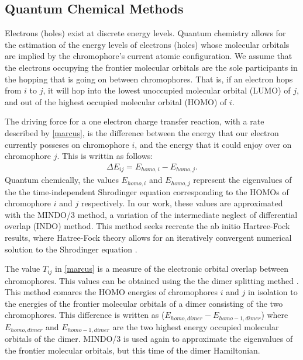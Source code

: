 \subsection{Quantum Chemical Methods}
Electrons (holes) exist at discrete energy levels.
Quantum chemistry allows for the estimation of the energy levels of electrons (holes) whose
molecular orbitals are implied by the chromophore's current atomic configuration.
We assume that the electrons occupying the frontier molecular orbitals are the sole participants in the
hopping that is going on between chromophores. That is, if an electron hops from $i$ to $j$, it will hop
into the lowest unoccupied molecular orbital (LUMO) of $j$, and out of the
highest occupied molecular orbital (HOMO) of $i$.  

The driving force for a one electron charge transfer reaction, 
with a rate described by \autoref{marcus}, is the difference between the energy that our electron 
currently posseses 
on chromophore $i$, and the energy that it could enjoy over on chromophore $j$. 
This is writtin as follows:
\begin{align}
    \Delta E_{ij} = E_{homo, i} - E_{homo, j}.
    \label{gibbs}
\end{align}
Quantum chemically, the values $E_{homo, i}$ and $E_{homo, j}$ represent the eigenvalues of the the
time-independent Shrodinger equation corresponding to the HOMOs of chromophore $i$ and $j$ respectively. 
In our work, these values are approximated with the MINDO/3 method, a variation of the intermediate neglect of 
differential overlap (INDO) method. This method seeks recreate the ab initio Hartree-Fock
results, where Hatree-Fock theory allows for an iteratively convergent numerical solution to the
Shrodinger equation \cite{Thiel2014}. 

The value $T_{ij}$ in \autoref{marcus} is a measure of the electronic orbital overlap between chromophores.
This values can be obtained using the
the dimer splitting methed \cite{Huang2005b}. This method comares the HOMO energies of chromophores $i$ and
$j$ in isolation to the energies of the frontier molecular orbitals of a dimer
consisting of the two chromophores. 
This difference is written as ($E_{homo,dimer} - E_{homo-1,dimer}$) where $E_{homo,dimer}$ 
and $E_{homo-1,dimer}$ are the two highest energy occupied molecular orbitals of the dimer. MINDO/3 is used
again to approximate the eigenvalues of the frontier molecular orbitals, but this time of the dimer
Hamiltonian. 


